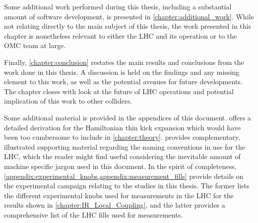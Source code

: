 Some additional work performed during this thesis, including a substantial amount of software development, is presented in \cref{chapter:additional_work}.
While not relating directly to the main subject of this thesis, the work presented in this chapter is nonetheless relevant to either the \acrshort{LHC} and its operation or to the \acrshort{OMC} team at large.

Finally, \cref{chapter:conclusion} restates the main results and conclusions from the work done in this thesis.
A discussion is held on the findings and any missing element to this work, as well as the potential avenues for future developments.
The chapter closes with look at the future of LHC operations and potential implication of this work to other colliders.

Some additional material is provided in the appendices of this document.
 offers a detailed derivation for the Hamiltonian thin kick expansion which would have been too cumbersome to include in \cref{chapter:theory}.
 provides complementary, illustrated supporting material regarding the naming conventions in use for the \acrshort{LHC}, which the reader might find useful considering the inevitable amount of machine specific jargon used in this document.
In the spirit of completeness, \cref{appendix:experimental_knobs,appendix:measurement_fills} provide details on the experimental campaign relating to the studies in this thesis.
The former lists the different experimental knobs used for measurements in the LHC for the results shown in \cref{chapter:IR_Local_Coupling}, and the latter provides a comprehensive list of the LHC fills used for measurements.


